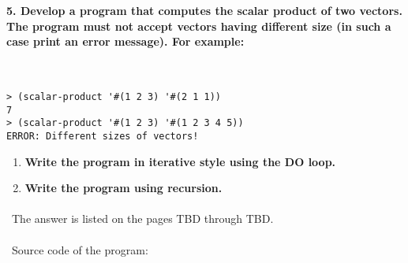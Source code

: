 \documentclass{article}
\begin{document}
\paragraph{}\
\paragraph{}\

\paragraph{5. Develop a program that computes the scalar product of two vectors. The program must not accept vectors having different size (in such a case print an error message). For example: }\

\begin{verbatim} 
> (scalar-product '#(1 2 3) '#(2 1 1))
7
> (scalar-product '#(1 2 3) '#(1 2 3 4 5))
ERROR: Different sizes of vectors!
\end{verbatim}

\begin{enumerate}[label=(\alph*)]

	\item \textbf{Write the program in iterative style using the DO loop.}
	
	\item \textbf{Write the program using recursion.}
					
\end{enumerate}

\paragraph{}\
	The answer is listed on the pages TBD through TBD.
	
\paragraph{}\
Source code of the program:
	
\end{document}
